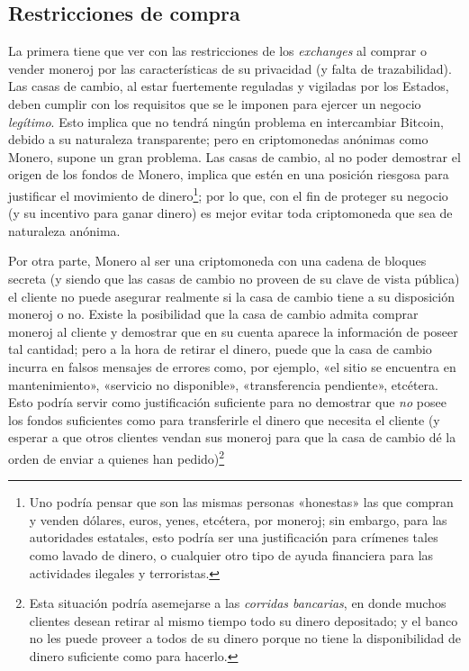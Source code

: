 \documentclass[12pt,a4paper,twoside]{book}
\begin{document}
\subsection{Restricciones de compra}
La primera tiene que ver con las restricciones de los \textit{exchanges} al comprar o vender moneroj por las características de su privacidad (y falta de trazabilidad). Las casas de cambio, al estar fuertemente reguladas y vigiladas por los Estados, deben cumplir con los requisitos que se le imponen para ejercer un negocio \textit{legítimo}. Esto implica que no tendrá ningún problema en intercambiar Bitcoin, debido a su naturaleza transparente; pero en criptomonedas anónimas como Monero, supone un gran problema. Las casas de cambio, al no poder demostrar el origen de los fondos de Monero, implica que estén en una posición riesgosa para justificar el movimiento de dinero\footnote{Uno podría pensar que son las mismas personas «honestas» las que compran y venden dólares, euros, yenes, etcétera, por moneroj; sin embargo, para las autoridades estatales, esto podría ser una justificación para crímenes tales como lavado de dinero, o cualquier otro tipo de ayuda financiera para las actividades ilegales y terroristas.}; por lo que, con el fin de proteger su negocio (y su incentivo para ganar dinero) es mejor evitar toda criptomoneda que sea de naturaleza anónima.

Por otra parte, Monero al ser una criptomoneda con una cadena de bloques secreta (y siendo que las casas de cambio no proveen de su clave de vista pública) el cliente no puede asegurar realmente si la casa de cambio tiene a su disposición moneroj o no. Existe la posibilidad que la casa de cambio admita comprar moneroj al cliente y demostrar que en su cuenta aparece la información de poseer tal cantidad; pero a la hora de retirar el dinero, puede que la casa de cambio incurra en falsos mensajes de errores como, por ejemplo, «el sitio se encuentra en mantenimiento», «servicio no disponible», «transferencia pendiente», etcétera. Esto podría servir como justificación suficiente para no demostrar que \textit{no} posee los fondos suficientes como para transferirle el dinero que necesita el cliente (y esperar a que otros clientes vendan sus moneroj para que la casa de cambio dé la orden de enviar a quienes han pedido)\footnote{Esta situación podría asemejarse a las \textit{corridas bancarias}, en donde muchos clientes desean retirar al mismo tiempo todo su dinero depositado; y el banco no les puede proveer a todos de su dinero porque no tiene la disponibilidad de dinero suficiente como para hacerlo.}
\end{document}
